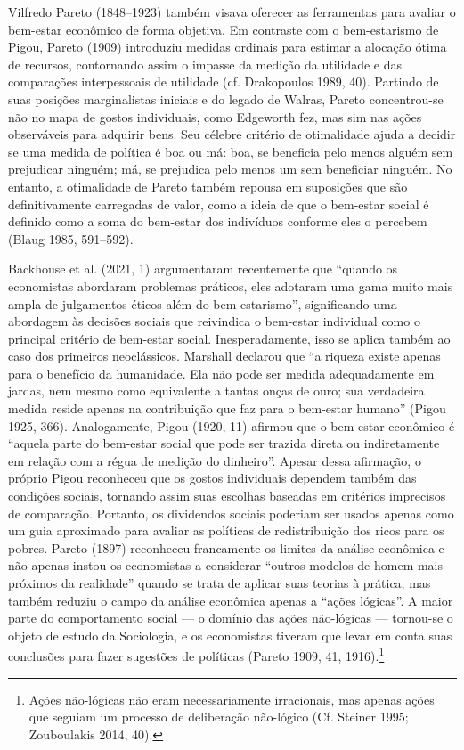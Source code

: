 \documentclass[12pt]{article}
\begin{document}
Vilfredo Pareto (1848–1923) também visava oferecer as ferramentas para avaliar o bem-estar econômico de forma objetiva. Em contraste com o bem-estarismo de Pigou, Pareto (1909) introduziu medidas ordinais para estimar a alocação ótima de recursos, contornando assim o impasse da medição da utilidade e das comparações interpessoais de utilidade (cf. Drakopoulos 1989, 40). Partindo de suas posições marginalistas iniciais e do legado de Walras, Pareto concentrou-se não no mapa de gostos individuais, como Edgeworth fez, mas sim nas ações observáveis para adquirir bens. Seu célebre critério de otimalidade ajuda a decidir se uma medida de política é boa ou má: boa, se beneficia pelo menos alguém sem prejudicar ninguém; má, se prejudica pelo menos um sem beneficiar ninguém. No entanto, a otimalidade de Pareto também repousa em suposições que são definitivamente carregadas de valor, como a ideia de que o bem-estar social é definido como a soma do bem-estar dos indivíduos conforme eles o percebem (Blaug 1985, 591–592).

Backhouse et al. (2021, 1) argumentaram recentemente que “quando os economistas abordaram problemas práticos, eles adotaram uma gama muito mais ampla de julgamentos éticos além do bem-estarismo”, significando uma abordagem às decisões sociais que reivindica o bem-estar individual como o principal critério de bem-estar social. Inesperadamente, isso se aplica também ao caso dos primeiros neoclássicos. Marshall declarou que “a riqueza existe apenas para o benefício da humanidade. Ela não pode ser medida adequadamente em jardas, nem mesmo como equivalente a tantas onças de ouro; sua verdadeira medida reside apenas na contribuição que faz para o bem-estar humano” (Pigou 1925, 366). Analogamente, Pigou (1920, 11) afirmou que o bem-estar econômico é “aquela parte do bem-estar social que pode ser trazida direta ou indiretamente em relação com a régua de medição do dinheiro”. Apesar dessa afirmação, o próprio Pigou reconheceu que os gostos individuais dependem também das condições sociais, tornando assim suas escolhas baseadas em critérios imprecisos de comparação. Portanto, os dividendos sociais poderiam ser usados apenas como um guia aproximado para avaliar as políticas de redistribuição dos ricos para os pobres. Pareto (1897) reconheceu francamente os limites da análise econômica e não apenas instou os economistas a considerar “outros modelos de homem mais próximos da realidade” quando se trata de aplicar suas teorias à prática, mas também reduziu o campo da análise econômica apenas a “ações lógicas”. A maior parte do comportamento social — o domínio das ações não-lógicas — tornou-se o objeto de estudo da Sociologia, e os economistas tiveram que levar em conta suas conclusões para fazer sugestões de políticas (Pareto 1909, 41, 1916).\footnote{Ações não-lógicas não eram necessariamente irracionais, mas apenas ações que seguiam um processo de deliberação não-lógico (Cf. Steiner 1995; Zouboulakis 2014, 40).}
\end{document}
